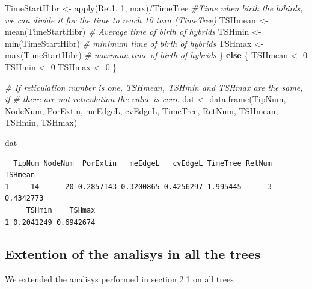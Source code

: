 \documentclass[
]{article}
\newenvironment{Shaded}{\begin{snugshade}}{\end{snugshade}}
\newcommand{\CommentTok}[1]{\textcolor[rgb]{0.56,0.35,0.01}{\textit{#1}}}
\newcommand{\ControlFlowTok}[1]{\textcolor[rgb]{0.13,0.29,0.53}{\textbf{#1}}}
\newcommand{\DecValTok}[1]{\textcolor[rgb]{0.00,0.00,0.81}{#1}}
\newcommand{\FunctionTok}[1]{\textcolor[rgb]{0.00,0.00,0.00}{#1}}
\newcommand{\NormalTok}[1]{#1}
\newcommand{\OtherTok}[1]{\textcolor[rgb]{0.56,0.35,0.01}{#1}}
\newcommand{\SpecialCharTok}[1]{\textcolor[rgb]{0.00,0.00,0.00}{#1}}
\begin{document}
\begin{Shaded}
\begin{Highlighting}[]
\NormalTok{    TimeStartHibr }\OtherTok{\textless{}{-}} \FunctionTok{apply}\NormalTok{(Ret1, }\DecValTok{1}\NormalTok{, max)}\SpecialCharTok{/}\NormalTok{TimeTree  }\CommentTok{\#Time when birth the hibirds, we can divide it for the time to reach 10 taxa (TimeTree)}
\NormalTok{    TSHmean }\OtherTok{\textless{}{-}} \FunctionTok{mean}\NormalTok{(TimeStartHibr)  }\CommentTok{\# Average time of birth of hybrids }
\NormalTok{    TSHmin }\OtherTok{\textless{}{-}} \FunctionTok{min}\NormalTok{(TimeStartHibr)  }\CommentTok{\# minimum time of birth of hybrids }
\NormalTok{    TSHmax }\OtherTok{\textless{}{-}} \FunctionTok{max}\NormalTok{(TimeStartHibr)  }\CommentTok{\# maximun time of birth of hybrids }
\NormalTok{\} }\ControlFlowTok{else}\NormalTok{ \{}
\NormalTok{    TSHmean }\OtherTok{\textless{}{-}} \DecValTok{0}
\NormalTok{    TSHmin }\OtherTok{\textless{}{-}} \DecValTok{0}
\NormalTok{    TSHmax }\OtherTok{\textless{}{-}} \DecValTok{0}
\NormalTok{\}}

\CommentTok{\# If reticulation number is one, TSHmean, TSHmin and TSHmax are the same, if}
\CommentTok{\# there are not reticulation the value is cero.}
\NormalTok{dat }\OtherTok{\textless{}{-}} \FunctionTok{data.frame}\NormalTok{(TipNum, NodeNum, PorExtin, meEdgeL, cvEdgeL, TimeTree, RetNum, }
\NormalTok{    TSHmean, TSHmin, TSHmax)}

\NormalTok{dat}
\end{Highlighting}
\end{Shaded}

\begin{verbatim}
  TipNum NodeNum  PorExtin   meEdgeL   cvEdgeL TimeTree RetNum   TSHmean
1     14      20 0.2857143 0.3200865 0.4256297 1.995445      3 0.4342773
     TSHmin    TSHmax
1 0.2041249 0.6942674
\end{verbatim}

\hypertarget{extention-of-the-analisys-in-all-the-trees}{%
\subsection{Extention of the analisys in all the
trees}\label{extention-of-the-analisys-in-all-the-trees}}

We extended the analisys performed in section 2.1 on all trees
\end{document}
